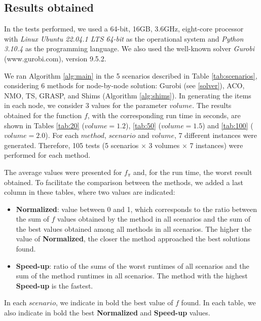 \documentclass[preprint]{elsarticle}
\begin{document}
{\color{blue}

\subsection{Results obtained}
In the tests performed, we used a 64-bit, 16GB, 3.6GHz, eight-core processor with {\it Linux Ubuntu 22.04.1 LTS 64-bit} as the operational system and {\it Python 3.10.4}\/ as the programming language. We also used the well-known solver {\it Gurobi}\/ (www.gurobi.com), version 9.5.2.

We ran Algorithm \ref{alg:main} in the 5 scenarios described in Table \ref{tab:scenarios}, considering 6 methods for node-by-node solution: Gurobi (see \ref{solver}), ACO, NMO, TS, GRASP, and Shims (Algorithm \ref{alg:shims}). In generating the items in each node, we consider 3 values for the parameter $volume$. The results obtained for the function $f$, with the corresponding run time in seconds, are shown in Tables \ref{tab:20} ($volume = 1.2$), \ref{tab:50} ($volume = 1.5$) and \ref{tab:100} ($volume = 2.0$). For each $method$, $scenario$\/ and $volume$, 7 different instances were generated. Therefore, 105 tests (5 scenarios $\times$\/ 3 volumes $\times$\/ 7 instances) were performed for each method. 

The average values were presented for $f_{\pi}$\/ and, for the run time, the worst result obtained. To facilitate the comparison between the methods, we added a last column in these tables, where two values are indicated:
\begin{itemize}
	\item {\bf Normalized}: value between 0 and 1, which corresponds to the ratio between the sum of $f$\/ values obtained by the method in all scenarios and the sum of the best values obtained among all methods in all scenarios. The higher the value of {\bf Normalized}, the closer the method approached the best solutions found.
	\item {\bf Speed-up}: ratio of the sums of the worst runtimes of all scenarios and the sum of the method runtimes in all scenarios. The method with the highest {\bf Speed-up}\/ is the fastest.
\end{itemize}

In each $scenario$, we indicate in bold the best value of $f$\/ found. In each table, we also indicate in bold the best {\bf Normalized}\/ and {\bf Speed-up}\/ values.


}
\end{document}

